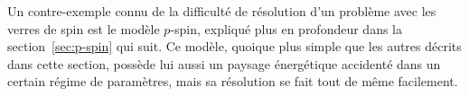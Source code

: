 
Un contre-exemple connu de la difficulté de résolution d'un problème avec les verres de spin est le modèle $p$-spin, expliqué plus en profondeur dans la section~\ref{sec:p-spin} qui suit.
Ce modèle, quoique plus simple que les autres décrits dans cette section, possède lui aussi un paysage énergétique accidenté dans un certain régime de paramètres, mais sa résolution se fait tout de même facilement.

